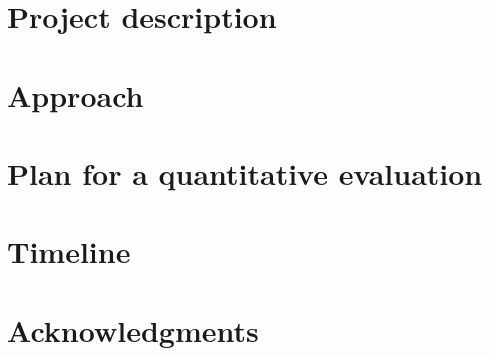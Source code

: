 \maketitle


\section{Project description}
\label{sec:description}


\section{Approach}
\label{sec:approach}


\section{Plan for a quantitative evaluation}
\label{sec:evaluation}


\section{Timeline}
\label{sec:timeline}


\ifacknowledgments
\section*{Acknowledgments}
\fi

\finalpage

\balance

{\footnotesize 
}

\checkpagelimit  
